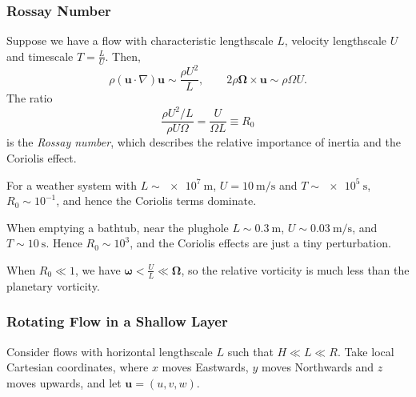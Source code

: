 \documentclass[12pt]{article}
\begin{document}
\subsubsection{Rossay Number}
\label{subsub:rossay_number}

Suppose we have a flow with characteristic lengthscale $L$, velocity lengthscale $U$ and timescale $T = \frac{L}{U}$. Then,
\[
\rho (\mathbf{u} \cdot \nabla)\mathbf{u} \sim \frac{\rho U^2}{L}, \qquad 2 \rho \bm{\Omega} \times \mathbf{u} \sim \rho \Omega U.
\]
The ratio
\[
\frac{\rho U^2/L}{\rho U \Omega} = \frac{U}{\Omega L} \equiv R_0
\]
is the \emph{Rossay number}, which describes the relative importance of inertia and the Coriolis effect.

\begin{exbox}
	For a weather system with $L \sim \qty{e7}{\metre}$, $U = \qty{10}{\metre \per \second}$ and $T \sim \qty{e5}{\second}$, $R_0 \sim 10^{-1}$, and hence the Coriolis terms dominate.

When emptying a bathtub, near the plughole $L \sim \qty{0.3}{\metre}$, $U \sim \qty{0.03}{\meter \per \second}$, and $T \sim \qty{10}{\second}$. Hence $R_0 \sim 10^{3}$, and the Coriolis effects are just a tiny perturbation.
\end{exbox}

When $R_0 \ll 1$, we have $\bm{\omega} < \frac{U}{L} \ll \bm{\Omega}$, so the relative vorticity is much less than the planetary vorticity.

\subsubsection{Rotating Flow in a Shallow Layer}
\label{subsub:rotating_flow_in_a_shallow_layer}

Consider flows with horizontal lengthscale $L$ such that $H \ll L \ll R$. Take local Cartesian coordinates, where $x$ moves Eastwards, $y$ moves Northwards and $z$ moves upwards, and let $\mathbf{u} = (u, v, w)$.
\end{document}

